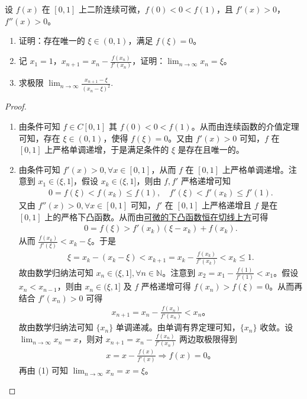 \documentclass[lang=cn,newtx,10pt,scheme=chinese]{../Template/elegantbook}
\begin{document}
\begin{example}
设 $f(x)$ 在 $[0,1]$ 上二阶连续可微，$f(0)<0<f(1)$，且 $f'(x)>0$，$f''(x)>0$。
\begin{enumerate}[(1)]
\item 证明：存在唯一的 $\xi \in (0,1)$，满足 $f(\xi) = 0$。
\item 记 $x_1 = 1$，$x_{n+1} = x_n - \frac{f(x_n)}{f'(x_n)}$，证明：$\lim_{n \to \infty} x_n = \xi$。
\item 求极限 $\lim_{n \to \infty} \frac{x_{n+1} - \xi}{(x_n - \xi)^2}$.
\end{enumerate}
\end{example}
\begin{proof}\begin{enumerate}[(1)]
\item 由条件可知 $f \in C[0,1]$ 其 $f(0) < 0 < f(1)$。从而由连续函数的介值定理可知，存在 $\xi \in (0,1)$，使得 $f(\xi) = 0$。又由 $f'(x) > 0$ 可知，$f$ 在 $[0,1]$ 上严格单调递增，于是满足条件的 $\xi$ 是存在且唯一的。

\item 由条件可知 $f'(x) > 0, \forall x \in [0,1]$，从而 $f$ 在 $[0,1]$ 上严格单调递增。注意到 $x_1 \in (\xi, 1]$，假设 $x_k \in (\xi, 1]$，则由 $f, f'$ 严格递增可知
\begin{align*}
0 = f(\xi) < f(x_k) \leqslant f(1), \quad f'(\xi) < f'(x_k) \leqslant f'(1).
\end{align*}
又由 $f''(x) > 0, \forall x \in [0,1]$ 可知，$f'$ 在 $[0,1]$ 上严格递增且 $f$ 是在 $[0,1]$ 上的严格下凸函数。从而由\hyperref[Basis of Analytics-可微的下凸函数恒在切线上方]{可微的下凸函数恒在切线上方}可得
\begin{align*}
0 = f(\xi) > f'(x_k)(\xi - x_k) + f(x_k).
\end{align*}
从而 $\frac{f(x_k)}{f'(\xi)} < x_k - \xi$。于是
\begin{align*}
\xi = x_k - (x_k - \xi) < x_{k+1} = x_k - \frac{f(x_k)}{f'(x_k)} < x_k \leqslant 1.
\end{align*}
故由数学归纳法可知 $x_n \in (\xi, 1], \forall n \in \mathbb{N}$。注意到 $x_2 = x_1 - \frac{f(1)}{f'(1)} < x_1$。假设 $x_n < x_{n-1}$，则由 $x_n \in (\xi, 1]$ 及 $f$ 严格递增可得 $f(x_n) > f(\xi) = 0$。从而再结合 $f'(x_n) > 0$ 可得
\begin{align*}
x_{n+1} = x_n - \frac{f(x_n)}{f'(x_n)} < x_n。
\end{align*}
故由数学归纳法可知 $\{x_n\}$ 单调递减。由单调有界定理可知，$\{x_n\}$ 收敛。设 $\lim_{n \to \infty} x_n = x$，则对 $x_{n+1} = x_n - \frac{f(x_n)}{f'(x_n)}$ 两边取极限得到
\begin{align*}
x = x - \frac{f(x)}{f'(x)} \Rightarrow f(x) = 0。
\end{align*}
再由 (1) 可知 $\lim_{n \to \infty} x_n = x = \xi$。


\end{enumerate}
\end{proof}
\end{document}
